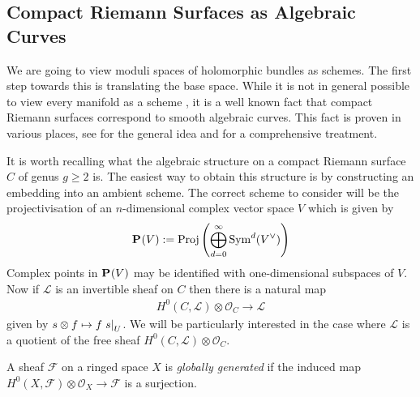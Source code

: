 \documentclass[12pt]{ociamthesis}  %
\begin{document}
\missingsection

\subsection{Compact Riemann Surfaces as Algebraic Curves}
\label{sec:surfaces_as_curves}

We are going to view moduli spaces of holomorphic bundles
as schemes. The first step towards this is translating the
base space. While it is not in general possible to view
every manifold as a scheme \missingcitation, it is a well
known fact that compact Riemann surfaces correspond to smooth
algebraic curves.
This fact is proven in various places, see \cite[215]{griffiths1994}
for the general idea and \cite[5-16]{harris2011}
for a comprehensive treatment.

It is worth recalling what the algebraic structure on a compact
Riemann surface $C$ of genus $g\geq 2$ is. The easiest way to obtain
this structure is by constructing an embedding into an ambient
scheme. The correct scheme to consider will be the projectivisation
of an $n$-dimensional complex vector space $V$ which is given
by
\begin{align*}
  \mathbf{P}^{}_{}(V) := \operatorname{Proj}\left({
      \bigoplus_{d=0}^\infty \operatorname{Sym}^d(V^\vee)
  }\right)
\end{align*}
Complex points in $\mathbf{P}^{}_{}(V)$ may be identified
with one-dimensional subspaces of $V$. \missingcitation
Now if $\mathcal L$ is
an invertible sheaf on $C$ then there is a natural map
\begin{align}\label{eq:natural_line_bundle_map}
  H^0(C,\mathcal L)\otimes\mathcal O_C \to \mathcal L
\end{align}
given by $s\otimes f \mapsto f\left.{s}\right\vert_{U}$. We will be
particularly interested in the case where $\mathcal L$ is a
quotient of the free sheaf $H^0(C,\mathcal L)\otimes\mathcal O_C$.

\begin{definition}
  A sheaf $\mathcal F$ on a ringed space $X$ is
  \emph{globally generated} if the induced map
  $H^0(X,\mathcal F) \otimes \mathcal O_X \to \mathcal F$
  is a surjection.
\end{definition}
\end{document}
